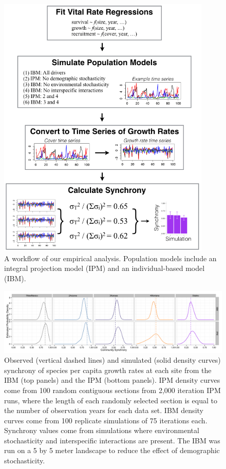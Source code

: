\documentclass[12pt,]{article}
\begin{document}
\begin{figure}[!ht]
  \centering
      \includegraphics[width=4in]{./components/synchrony_flowchart.png}
  \caption{A workflow of our empirical analysis. Population models include an integral projection model (IPM) and an individual-based model (IBM).}
\end{figure}

\pagebreak{}

\begin{figure}[!ht]
  \centering
      \includegraphics[width=6in]{./components/figureS1.png}
  \caption{Observed (vertical dashed lines) and simulated (solid density curves) synchrony of species per capita growth rates at each site from the IBM (top panels) and the IPM (bottom panels). IPM density curves come from 100 random contiguous sections from 2,000 iteration IPM runs, where the length of each randomly selected section is equal to the number of observation years for each data set. IBM density curves come from 100 replicate simulations of 75 iterations each. Synchrony values come from simulations where environmental stochasticity and interspecific interactions are present. The IBM was run on a 5 by 5 meter landscape to reduce the effect of demographic stochasticity.}
\end{figure}
\end{document}
